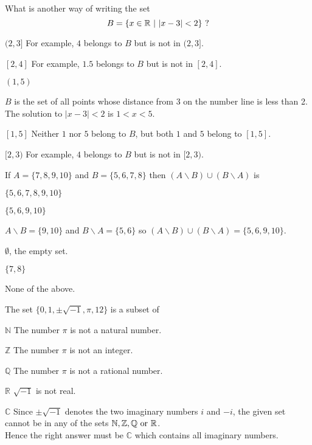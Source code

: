 \documentclass[pst2pdf]{mathquiz}
\begin{document}
\begin{question}
What is another way of writing the set
\[B= \{x \in {\mathbb R}\ |\ |x-3|<2 \}\ \rm{?}\]
\begin{choice}
\incorrect $(2,3]$
\response For example, $4$ belongs to $B$ but is not in $(2,3]$.

\incorrect $[2,4]$
\response For example, $1.5$ belongs to $B$ but is not in $[2,4]$.

\correct $(1,5)$

\response $B$ is the set of all points whose distance from 3 on the
number line is less than 2. \\
The solution to $|x-3|<2$ is $1<x<5$.

\incorrect $[1,5]$
\response Neither $1$ nor $5$  belong to $B$, but both $1$ and $5$ belong to $[1,5]$.

\incorrect $[2,3)$
\response For example, $4$ belongs to $B$ but is not in $[2,3)$.

\end{choice}
\end{question}


\begin{question}
If $A=\{7,8,9,10\}$ and $B=\{5,6,7,8\}$ then $(A\backslash
B)\cup(B\backslash A)$ is
\begin{choice}
\incorrect $\{5,6,7,8,9,10\}$

\correct $\{5,6,9,10\}$

\response $A\backslash B=\{9,10\}$ and $B\backslash A=\{5,6\}$ so
$(A\backslash B)\cup(B\backslash A)=\{5,6,9,10\}$.

\incorrect $\emptyset$, the empty set.


\incorrect $\{7,8\}$

\incorrect None of the above.

\end{choice}
\end{question}

\begin{question}
The set \(\{0,1,\pm\sqrt{-1},\pi,12\}\) is a subset of
\begin{choice}
\incorrect $\mathbb N$
\response The number \(\pi\) is not a natural number.

\incorrect $\mathbb Z$
\response The number \(\pi\) is not an integer.

\incorrect $\mathbb Q$
\response The number \(\pi\) is not a rational number.

\incorrect $\mathbb R$
\response \(\sqrt{-1}\) is not real.

\correct $\mathbb C$
\response Since \(\pm\sqrt{-1}\)  denotes the two imaginary numbers  $i$ and $-i$, the given set cannot be
in any of the sets $\mathbb{N,Z,Q}\ \rm{or}\ \mathbb{R}$.  \\
Hence the
right answer must be ${\mathbb C}$ which contains all imaginary
numbers.

\end{choice}
\end{question}
\end{document}
